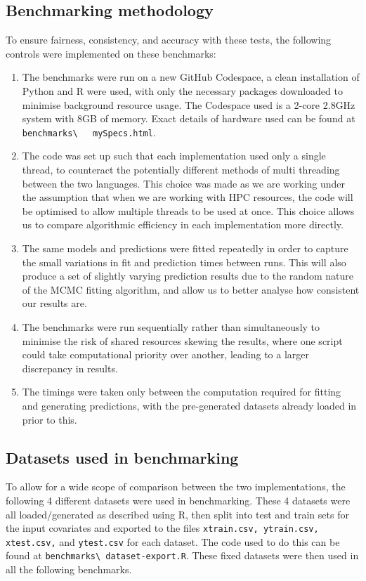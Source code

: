 \documentclass[11pt,twoside,a4paper]{article}
\begin{document}
\subsection{Benchmarking methodology}
To ensure fairness, consistency, and accuracy with these tests, the following controls were implemented on these benchmarks:
\begin{enumerate}
	\item The benchmarks were run on a new GitHub Codespace, a clean installation of Python and R were used, with only the necessary packages downloaded to minimise background resource usage. The Codespace used is a 2-core 2.8GHz system with 8GB of memory. Exact details of hardware used can be found at \nolinkurl{benchmarks\   mySpecs.html}\cite{repo}.
	\item The code was set up such that each implementation used only a single thread, to counteract the potentially different methods of multi threading between the two languages. This choice was made as we are working under the assumption that when we are working with HPC resources, the code will be optimised to allow multiple threads to be used at once. This choice allows us to compare algorithmic efficiency in each implementation more directly.
	\item The same models and predictions were fitted repeatedly in order to capture the small variations in fit and prediction times between runs. This will also produce a set of slightly varying prediction results due to the random nature of the MCMC fitting algorithm, and allow us to better analyse how consistent our results are.
	\item The benchmarks were run sequentially rather than simultaneously to minimise the risk of shared resources skewing the results, where one script could take computational priority over another, leading to a larger discrepancy in results.
	\item The timings were taken only between the computation required for fitting and generating predictions, with the pre-generated datasets already loaded in prior to this.
\end{enumerate}
\subsection{Datasets used in benchmarking}
To allow for a wide scope of comparison between the two implementations, the following 4 different datasets were used in benchmarking. These 4 datasets were all loaded/generated as described using R, then split into test and train sets for the input covariates and exported to the files \texttt{xtrain.csv, ytrain.csv, xtest.csv,} and \texttt{ytest.csv} for each dataset. The code used to do this can be found at \nolinkurl{benchmarks\ dataset-export.R}\cite{repo}. These fixed datasets were then used in all the following benchmarks.
\end{document}
